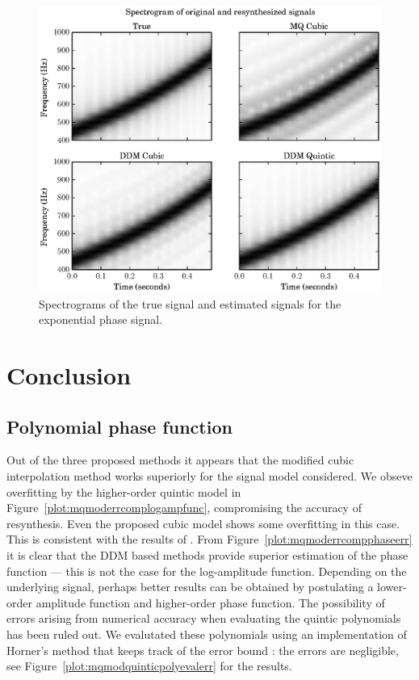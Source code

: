 \begin{figure}[!t]
    \centering
    \includegraphics[width=\figwidthscale\textwidth]{plots/mq_exp_err_comp_all_spect.eps}
    \caption{
        Spectrograms of the true signal and estimated signals for the
        exponential phase signal.
    \label{plot:mqexperrorallspect}}
\end{figure}

\section{Conclusion}

\subsection{Polynomial phase function}

Out of the three proposed methods it appears that the modified cubic
interpolation method works superiorly for the signal model considered. We obseve
overfitting by the higher-order quintic model in
Figure~\ref{plot:mqmoderrcomplogampfunc}, compromising the accuracy of
resynthesis.  Even the proposed cubic model shows some overfitting in this case.
This is consistent with the results of \cite{girin2003comparing}. From
Figure~\ref{plot:mqmoderrcompphaseerr} it is clear that the DDM based methods
provide superior estimation of the phase function --- this is not the case for
the log-amplitude function. Depending on the underlying signal, perhaps better
results can be obtained by postulating a lower-order amplitude function and
higher-order phase function. The possibility of errors arising from numerical
accuracy when evaluating the quintic polynomials has been ruled out.  We
evalutated these polynomials using an implementation of Horner's method that
keeps track of the error bound \cite[p.~95]{higham2002accuracy}: the errors are
negligible, see Figure~\ref{plot:mqmodquinticpolyevalerr} for the results.

